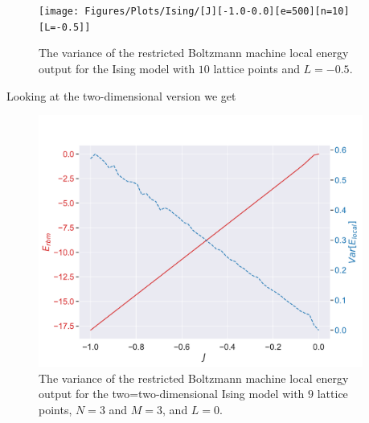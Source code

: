 \begin{figure}[H]
  \begin{center}
    \texttt{[image: Figures/Plots/Ising/[J][-1.0-0.0][e=500][n=10][L=-0.5]]}
  \end{center}
  \caption{The variance of the restricted Boltzmann machine local energy output for the Ising model with $10$ lattice points and $L=-0.5$.}
\end{figure}

Looking at the two-dimensional version we get

\begin{figure}[H]
  \begin{center}
    \includegraphics[width=0.95\textwidth]{Figures/Plots/Ising/[J][-1.0-0.0][e=500][n=9][L=0]}
  \end{center}
  \caption{The variance of the restricted Boltzmann machine local energy output for the two=two-dimensional Ising model with $9$ lattice points, $N=3$ and $M=3$, and $L=0$.}
\end{figure}


